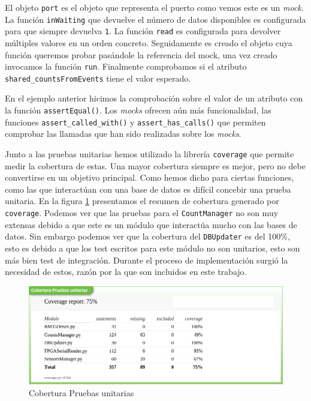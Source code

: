 	\par
	El objeto \texttt{port} es el objeto que representa el puerto como vemos este es un \emph{mock}. La función \texttt{inWaiting} que devuelve el
	número de datos disponibles es configurada para que siempre devuelva \texttt{1}. La función \texttt{read} es configurada para devolver
	múltiples valores en un orden concreto. Seguidamente es creado el objeto cuya función queremos probar pasándole la referencia del mock, una
	vez creado invocamos la función \texttt{run}. Finalmente comprobamos si el atributo \texttt{shared\_countsFromEvents} tiene el valor esperado.
	\par
	En el ejemplo anterior hicimos la comprobación sobre el valor de un atributo con la función \texttt{assertEqual()}. Los \emph{mocks} ofrecen
	aún más funcionalidad, las funciones \texttt{assert\_called\_with()} y \texttt{assert\_has\_calls()} que permiten comprobar las llamadas que
	han sido realizadas sobre los \emph{mocks}.
	\par
	Junto a las pruebas unitarias hemos utilizado la librería \texttt{coverage} que permite medir la cobertura de estas. Una mayor cobertura
	siempre es mejor, pero no debe convertirse en un objetivo principal. Como hemos dicho para ciertas funciones, como las que interactúan con una
	base de datos es difícil concebir una prueba unitaria. En la figura \ref{fig:coverage} presentamos el resumen de cobertura generado por
	\texttt{coverage}. Podemos ver que las pruebas para el \texttt{CountManager} no son muy extensas debido a que este es un módulo que interactúa
	mucho con las bases de datos. Sin embargo podemos ver que la cobertura del \texttt{DBUpdater} es del 100\%, esto es debido a que los test
	escritos para este módulo no son unitarios, esto son más bien test de integración. Durante el proceso de implementación surgió la necesidad de
	estos, razón por la que son incluidos en este trabajo.
	\begin{figure}[h]
		\centering
		\includegraphics[keepaspectratio, width=1\textwidth]{./img/coverage.png}
		\caption{Cobertura Pruebas unitarias}   
		\label{fig:coverage}
	\end{figure}

